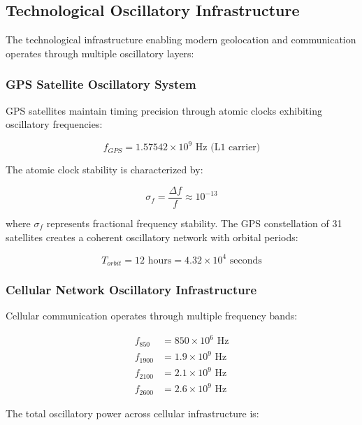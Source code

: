\documentclass[12pt]{article}
\begin{document}
\subsection{Technological Oscillatory Infrastructure}

The technological infrastructure enabling modern geolocation and communication operates through multiple oscillatory layers:

\subsubsection{GPS Satellite Oscillatory System}

GPS satellites maintain timing precision through atomic clocks exhibiting oscillatory frequencies:

\begin{equation}
f_{GPS} = 1.57542 \times 10^9 \text{ Hz (L1 carrier)}
\end{equation}

The atomic clock stability is characterized by:

\begin{equation}
\sigma_f = \frac{\Delta f}{f} \approx 10^{-13}
\end{equation}

where $\sigma_f$ represents fractional frequency stability. The GPS constellation of 31 satellites creates a coherent oscillatory network with orbital periods:

\begin{equation}
T_{orbit} = 12 \text{ hours} = 4.32 \times 10^4 \text{ seconds}
\end{equation}

\subsubsection{Cellular Network Oscillatory Infrastructure}

Cellular communication operates through multiple frequency bands:

\begin{align}
f_{850} &= 850 \times 10^6 \text{ Hz} \\
f_{1900} &= 1.9 \times 10^9 \text{ Hz} \\
f_{2100} &= 2.1 \times 10^9 \text{ Hz} \\
f_{2600} &= 2.6 \times 10^9 \text{ Hz}
\end{align}

The total oscillatory power across cellular infrastructure is:
\end{document}
